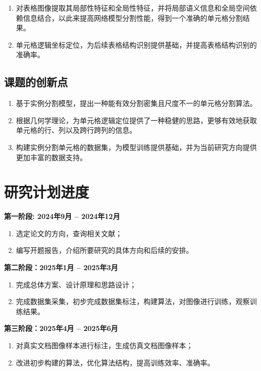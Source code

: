 \documentclass[UTF8,12pt, AutoFakeBold,fontset = founder]{ctexart}
\begin{document}
\begin{enumerate}[label=(\arabic*), leftmargin=40pt]
    \item 对表格图像提取其局部性特征和全局性特征，并将局部语义信息和全局空间依赖信息结合，以此来提高网络模型分割性能，得到一个准确的单元格分割结果。
    \item 单元格逻辑坐标定位，为后续表格结构识别提供基础，并提高表格结构识别的准确率。
\end{enumerate}
\subsection{课题的创新点}
\begin{enumerate}[label=(\arabic*), leftmargin=40pt]
    \item 基于实例分割模型，提出一种能有效分割密集且尺度不一的单元格分割算法。
    \item 根据几何学理论，为单元格逻辑定位提供了一种稳健的思路，更够有效地获取单元格的行、列以及跨行跨列的信息。
    \item 构建实例分割单元格的数据集，为模型训练提供基础，并为当前研究方向提供更加丰富的数据支持。
\end{enumerate}

\section{研究计划进度}
\noindent %
\textbf{第一阶段: 2024年9月 -- 2024年12月}
\begin{enumerate}[label=(\arabic*), leftmargin=40pt]
    \item 选定论文的方向，查询相关文献；
    \item 编写开题报告，介绍所要研究的具体方向和后续的安排。
\end{enumerate}
\textbf{第二阶段：2025年1月 -- 2025年3月}
\begin{enumerate}[label=(\arabic*), leftmargin=40pt]
    \item 完成总体方案、设计原理和思路设计；
    \item 完成数据集采集，初步完成数据集标注，构建算法，对图像进行训练，观察训练结果。
\end{enumerate}
\textbf{第三阶段：2025年4月 -- 2025年6月}
\begin{enumerate}[label=(\arabic*), leftmargin=40pt]
    \item 对真实文档图像样本进行标注，生成仿真文档图像样本；
    \item 改进初步构建的算法，优化算法结构，提高训练效率、准确率。
\end{enumerate}
\end{document}
